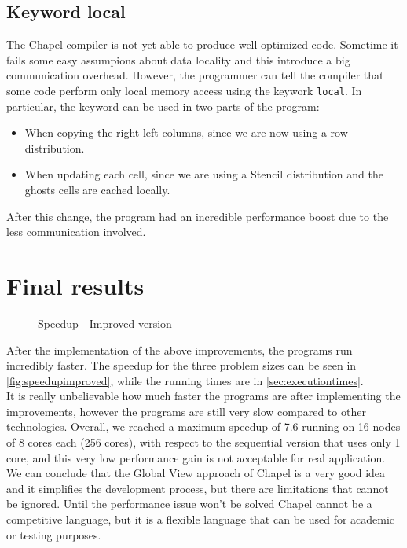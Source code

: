 \documentclass{article}
\begin{document}
\subsection{Keyword local}
The Chapel compiler is not yet able to produce well optimized code. Sometime it fails some easy assumpions about data locality and this introduce a big communication overhead. However, the programmer can tell the compiler that some code perform only local memory access using the keywork \texttt{local}. In particular, the keyword can be used in two parts of the program:
\begin{itemize}
    \item When copying the right-left columns, since we are now using a row distribution.
    \item When updating each cell, since we are using a Stencil distribution and the ghosts cells are cached locally.
\end{itemize}
After this change, the program had an incredible performance boost due to the less communication involved.


\section{Final results}
\begin{figure}
\centering
{}
\caption{Speedup - Improved version}
\label{fig:speedupimproved}
\end{figure}

After the implementation of the above improvements, the programs run incredibly faster. The speedup for the three problem sizes can be seen in \autoref{fig:speedupimproved}, while the running times are in \autoref{sec:executiontimes}. \\
It is really unbelievable how much faster the programs are after implementing the improvements, however the programs are still very slow compared to other technologies. Overall, we reached a maximum speedup of 7.6 running on 16 nodes of 8 cores each (256 cores), with respect to the sequential version that uses only 1 core, and this very low performance gain is not acceptable for real application. \\
We can conclude that the Global View approach of Chapel is a very good idea and it simplifies the development process, but there are limitations that cannot be ignored. Until the performance issue won't be solved Chapel cannot be a competitive language, but it is a flexible language that can be used for academic or testing purposes.
\end{document}
